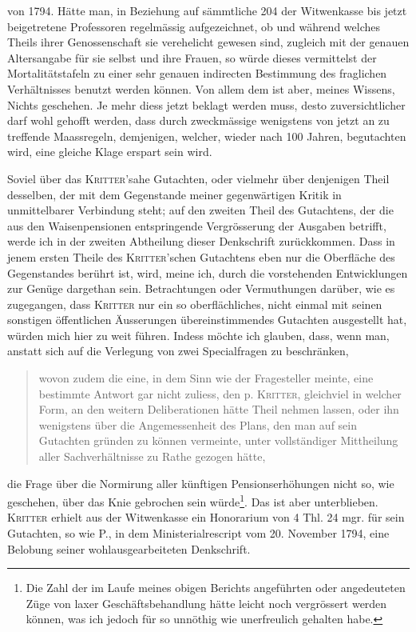 von 1794. Hätte man, in Beziehung auf sämmtliche 204 der Witwenkasse bis jetzt beigetretene Professoren regelmässig aufgezeichnet, ob und während welches Theils ihrer Genossenschaft sie verehelicht gewesen sind, zugleich mit der genauen Altersangabe für sie selbst und ihre Frauen, so würde dieses vermittelst der Mortalitätstafeln zu einer sehr genauen indirecten Bestimmung des fraglichen Verhältnisses benutzt werden können. Von allem dem ist aber, meines Wissens, Nichts geschehen. Je mehr diess jetzt beklagt werden muss, desto zuversichtlicher darf wohl gehofft werden, dass durch zweckmässige wenigstens von jetzt an zu treffende Maassregeln, demjenigen, welcher, wieder nach 100 Jahren, begutachten wird, eine gleiche Klage erspart sein wird.

Soviel über das \textsc{Kritter}’sahe Gutachten, oder vielmehr über denjenigen Theil desselben, der mit dem Gegenstande meiner gegenwärtigen Kritik in unmittelbarer Verbindung steht; auf den zweiten Theil des Gutachtens, der die aus den Waisenpensionen entspringende Vergrösserung der Ausgaben betrifft, werde ich in der zweiten Abtheilung dieser Denkschrift zurückkommen. Dass in jenem ersten Theile des \textsc{Kritter}’schen Gutachtens eben nur die Oberfläche des Gegenstandes berührt ist, wird, meine ich, durch die vorstehenden Entwicklungen zur Genüge dargethan sein. Betrachtungen oder Vermuthungen darüber, wie es zugegangen, dass \textsc{Kritter} nur ein so oberflächliches, nicht einmal mit seinen sonstigen öffentlichen Äusserungen übereinstimmendes Gutachten ausgestellt hat, würden mich hier zu weit führen. Indess möchte ich glauben, dass, wenn man, anstatt sich auf die Verlegung von zwei Specialfragen zu beschränken,
\begin{quote}
wovon zudem die eine, in dem Sinn wie der Fragesteller meinte, eine bestimmte Antwort gar nicht zuliess, den p. \textsc{Kritter}, gleichviel in welcher Form, an den weitern Deliberationen hätte Theil nehmen lassen, oder ihn wenigstens über die Angemessenheit des Plans, den man auf sein Gutachten gründen zu können vermeinte, unter vollständiger Mittheilung aller Sachverhältnisse zu Rathe gezogen hätte,
\end{quote}
\noindent die Frage über die Normirung aller künftigen Pensionserhöhungen nicht so, wie geschehen, über das Knie gebrochen sein würde\footnote{Die Zahl der im Laufe meines obigen Berichts angeführten oder angedeuteten Züge von laxer Geschäftsbehandlung hätte leicht noch vergrössert werden können, was ich jedoch für so unnöthig wie unerfreulich gehalten habe.}. Das ist aber unterblieben. \textsc{Kritter} erhielt aus der Witwenkasse ein Honorarium von 4 Thl. 24 mgr. für sein Gutachten, so wie P., in dem Ministerialrescript vom 20. November 1794, eine Belobung seiner wohlausgearbeiteten Denkschrift.

